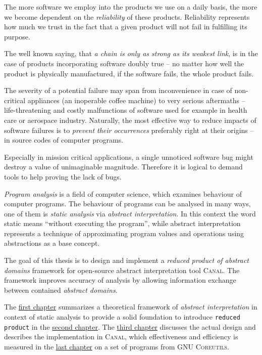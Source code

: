 \documentclass[12pt,oneside]{fithesis2}
\theoremstyle{definition}
\begin{document}
The more software we employ into the products we use on a daily basis, the more we become dependent on the \textit{reliability} of these products. Reliability represents how much we trust in the fact that a given product will not fail in fulfilling its purpose.

The well known saying, that \textit{a chain is only as strong as its weakest link}, is in the case of products incorporating software doubly true -- no matter how well the product is physically manufactured, if the software fails, the whole product fails.

The severity of a potential failure may span from inconvenience in case of non-critical appliances (an inoperable coffee machine) to very serious aftermaths -- life-threatening and costly malfunctions of software used for example in health care or aerospace industry. Naturally, the most effective way to reduce impacts of software failures is to \textit{prevent their occurrences} preferably right at their origins -- in source codes of computer programs.

Especially in mission critical applications, a single unnoticed software bug might destroy a value of unimaginable magnitude. Therefore it is logical to demand tools to help proving the lack of bugs.

\textit{Program analysis} is a field of computer science, which examines behaviour of computer programs. The behaviour of programs can be analysed in many ways, one of them is \textit{static analysis} via \textit{abstract interpretation}. In this context the word static means ``without executing the program'', while abstract interpretation represents a technique of approximating program values and operations using abstractions as a base concept.

The goal of this thesis is to design and implement a \textit{reduced product of abstract domains} framework for open-source abstract interpretation tool \textsc{Canal}. The framework improves accuracy of analysis by allowing information exchange between contained \textit{abstract domains}.

The \hyperref[ch:abstract-interpretation]{first chapter} summarizes a theoretical framework of \textit{abstract interpretation} in context of static analysis to provide a solid foundation to introduce \texttt{reduced product} in the \hyperref[ch:reduced-product]{second chapter}. The \hyperref[ch:implementation]{third chapter} discusses the actual design and describes the implementation in \textsc{Canal}, which effectiveness and efficiency is measured in the \hyperref[ch:measurements]{last chapter} on a set of programs from \textsc{GNU Coreutils}.
\end{document}
